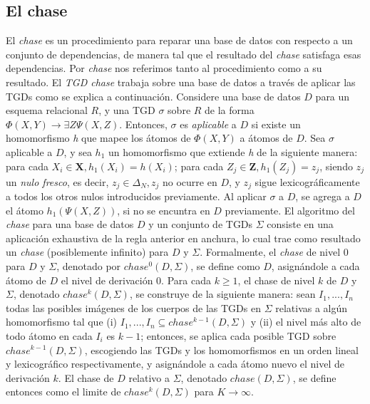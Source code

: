 \documentclass[11pt,a4paper,twoside]{tesis}
\begin{document}
\subsection{El chase}

El \textit{chase} es un procedimiento para reparar una base de datos con respecto a un conjunto de dependencias, de manera tal que el resultado del \textit{chase} satisfaga esas dependencias. Por \textit{chase} nos referimos tanto al procedimiento como a su resultado. El \textit{TGD chase} trabaja sobre una base de datos a través de aplicar las TGDs como se explica a continuación. Considere una base de datos $D$ para un esquema relacional $R$, y una TGD $\sigma$ sobre $R$ de la forma $\Phi (X, Y) \rightarrow \exists Z \Psi (X, Z)$. Entonces, $\sigma$ es \textit{aplicable} a $D$ si existe un homomorfismo \textit{h} que mapee los átomos de $\Phi (X, Y)$ a átomos de $D$. Sea $\sigma$ aplicable a $D$, y sea $h_1$ un homomorfismo que extiende \textit{h} de la siguiente manera: para cada $X_i \in \textbf{X}, h_1(X_i) = h(X_i)$; para cada $Z_j \in \textbf{Z}, h_1(Z_j) = z_j$, siendo $z_j$ un \textit{nulo fresco}, es decir, $z_j \in \Delta_N, z_j$ no ocurre en $D$, y $z_j$ sigue lexicográficamente a todos los otros nulos introducidos previamente. Al aplicar $\sigma$ a $D$, se agrega a $D$ el átomo $h_1(\Psi (X, Z))$, si no se encuntra en $D$ previamente.
El algoritmo del \textit{chase} para una base de datos $D$ y un conjunto de TGDs $\Sigma$ consiste en una aplicación exhaustiva de la regla anterior en anchura, lo cual trae como resultado un \textit{chase} (posiblemente infinito) para $D$ y $\Sigma$. Formalmente, el \textit{chase} de nivel 0 para $D$ y $\Sigma$, denotado por $chase^0(D,\Sigma)$, se define como $D$, asignándole a cada átomo de $D$ el nivel de derivación 0. Para cada $k \geq 1$, el chase de nivel $k$ de $D$ y $\Sigma$, denotado $chase^k(D, \Sigma)$, se construye de la siguiente manera: sean $I_1,...,I_n$ todas las posibles imágenes de los cuerpos de las TGDs en $\Sigma$ relativas a algún homomorfismo tal que (i) $I_1,...,I_n \subseteq chase^{k-1}(D,\Sigma)$ y (ii) el nivel más alto de todo átomo en cada $I_i$ es $k - 1$; entonces, se aplica cada posible TGD sobre $chase^{k-1}(D,\Sigma)$, escogiendo las TGDs y los homomorfismos en un orden lineal y lexicográfico respectivamente, y asignándole a cada átomo nuevo el nivel de derivación $k$. El chase de $D$ relativo a $\Sigma$, denotado $chase(D,\Sigma)$, se define entonces como el limite de $chase^k(D,\Sigma)$ para $K \rightarrow \infty$. 
\end{document}
